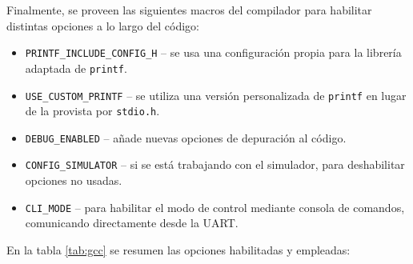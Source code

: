 Finalmente, se proveen las siguientes macros del compilador para habilitar distintas
opciones a lo largo del código:

\begin{itemize}
    \item \texttt{PRINTF\_INCLUDE\_CONFIG\_H} -- se usa una configuración propia para
    la librería adaptada de \texttt{printf}.
    \item \texttt{USE\_CUSTOM\_PRINTF} -- se utiliza una versión personalizada de
    \texttt{printf} en lugar de la provista por \lstinline[style=C]{stdio.h}.
    \item \texttt{DEBUG\_ENABLED} -- añade nuevas opciones de depuración al código.
    \item \texttt{CONFIG\_SIMULATOR} -- si se está trabajando con el simulador, para
    deshabilitar opciones no usadas.
    \item \texttt{CLI\_MODE} -- para habilitar el modo de control mediante consola
    de comandos, comunicando directamente desde la \ac{UART}.
\end{itemize}

En la tabla \ref{tab:gcc} se resumen las opciones habilitadas y empleadas:

